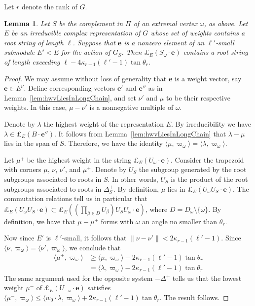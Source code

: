 \documentclass{amsart}
\theoremstyle{plain}
\newtheorem{lemma}[theorem]{Lemma}
\theoremstyle{definition}
\theoremstyle{remark}
\newcommand{\Vect}[1]{\mathbold{#1}}
\providecommand{\norm}[1]{\lVert#1\rVert}
\begin{document}
Let $r$ denote the rank of $G$.
\begin{lemma}\label{lem:l-2l'}
Let $S$ be the complement in $\Pi$ of an extremal vertex $\omega$,
as above. Let $E$ be an irreducible complex representation of
$G$ whose set of weights contains a root string of length $\ell$.
Suppose that $\Vect{e}$ is a nonzero element of an $\ell'$-small
submodule $E' < E$ for the action of $G_{S}$. Then
$\pounds_{E}(S_{\omega} \cdot \Vect{e})$ contains a root string of
length exceeding $\ell - 4\kappa_{r - 1}(\ell' - 1)\tan \theta_{r}$.
\end{lemma}
\begin{proof}
We may assume without loss of generality that $\Vect{e}$ is a
weight vector, say $\Vect{e} \in E^{\nu}$. Define corresponding
vectors $\Vect{e}'$ and $\Vect{e}''$ as in
Lemma~\ref{lem:hwvLiesInLongChain}, and set $\nu'$ and $\mu$ to be
their respective weights. In this case, $\mu - \nu'$ is a
nonnegative multiple of $\omega$.

Denote by $\lambda$ the highest weight of the representation $E$.
By irreducibility we have $\lambda \in \pounds_{E}(B \cdot
\Vect{e}'')$. It follows from Lemma~\ref{lem:hwvLiesInLongChain}
that $\lambda - \mu$ lies in the span of $S$. Therefore, we have
the identity $\langle \mu, \varpi_{\omega} \rangle = \langle
\lambda, \varpi_{\omega} \rangle$.

Let $\mu^{+}$ be the highest weight in the string
$\pounds_{E}(U_{\omega} \cdot \Vect{e})$. Consider the trapezoid
with corners $\mu$, $\nu$, $\nu'$, and $\mu^{+}$. Denote by
$U_{S}$ the subgroup generated by the root subgroups associated to
roots in $S$. In other words, $U_{S}$ is the product of the root
subgroups associated to roots in $\Delta^{+}_{S}$. By definition,
$\mu$ lies in $\pounds_{E}(U_{\omega}U_{S} \cdot \Vect{e})$. The
commutation relations tell us in particular that
$\pounds_{E}(U_{\omega}U_{S} \cdot \Vect{e}) \subset
\pounds_{E}((\prod_{\beta \in D} U_{\beta}) U_{S}U_{\omega} \cdot
\Vect{e})$, where $D = D_{\omega} \setminus \{\omega\}$. By definition, we have that $\mu - \mu^{+}$ forms with
$\omega$ an angle no smaller than $\theta_{r}$.

Now since $E'$ is $\ell'$-small, it follows that $\norm{\nu -
\nu'} < 2\kappa_{r - 1}(\ell' - 1)$. Since $\langle \nu, \varpi_{\omega}
\rangle = \langle \nu', \varpi_{\omega} \rangle$, we conclude that
\begin{equation*}
\begin{split}
\langle \mu^{+}, \varpi_{\omega} \rangle &\geqslant \langle \mu,
\varpi_{\omega} \rangle - 2\kappa_{r - 1}(\ell' - 1)\tan \theta_{r}\\
&= \langle \lambda,
\varpi_{\omega} \rangle - 2\kappa_{r - 1}(\ell' - 1)\tan \theta_{r}
\end{split}
\end{equation*}
The same
argument used for the opposite system $-\Delta^{+}$ tells us that
the lowest weight $\mu^{-}$ of $\pounds_{E}(U_{-\omega}\cdot
\Vect{e})$ satisfies $\langle \mu^{-}, \varpi_{\omega} \rangle
\leqslant \langle w_{0} \cdot \lambda, \varpi_{\omega} \rangle +
2\kappa_{r - 1}(\ell' - 1)\tan \theta_{r}$. The result follows.
\end{proof}
\end{document}
